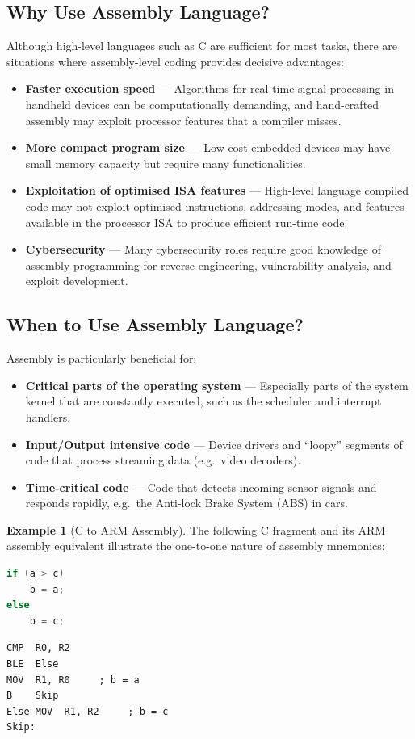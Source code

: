\documentclass[11pt, a4paper, notitlepage]{report}
\theoremstyle{definition}
\theoremstyle{remark}
\theoremstyle{definition}
\newtheorem{example}[theorem]{Example}
\begin{document}
\subsection{Why Use Assembly Language?}

Although high-level languages such as C are sufficient for most tasks, there are situations where assembly-level coding provides decisive advantages:

\begin{itemize}
  \item \textbf{Faster execution speed} --- Algorithms for real-time signal processing in handheld devices can be computationally demanding, and hand-crafted assembly may exploit processor features that a compiler misses.
  \item \textbf{More compact program size} --- Low-cost embedded devices may have small memory capacity but require many functionalities.
  \item \textbf{Exploitation of optimised ISA features} --- High-level language compiled code may not exploit optimised instructions, addressing modes, and features available in the processor ISA to produce efficient run-time code.
  \item \textbf{Cybersecurity} --- Many cybersecurity roles require good knowledge of assembly programming for reverse engineering, vulnerability analysis, and exploit development.
\end{itemize}

\subsection{When to Use Assembly Language?}

Assembly is particularly beneficial for:

\begin{itemize}
  \item \textbf{Critical parts of the operating system} --- Especially parts of the system kernel that are constantly executed, such as the scheduler and interrupt handlers.
  \item \textbf{Input/Output intensive code} --- Device drivers and ``loopy'' segments of code that process streaming data (e.g.\ video decoders).
  \item \textbf{Time-critical code} --- Code that detects incoming sensor signals and responds rapidly, e.g.\ the Anti-lock Brake System (ABS) in cars.
\end{itemize}

\begin{example}[C to ARM Assembly]
The following C fragment and its ARM assembly equivalent illustrate the one-to-one nature of assembly mnemonics:
\begin{lstlisting}[language=C]
if (a > c)
    b = a;
else
    b = c;
\end{lstlisting}
\begin{lstlisting}
CMP  R0, R2
BLE  Else
MOV  R1, R0     ; b = a
B    Skip
Else MOV  R1, R2     ; b = c
Skip:
\end{lstlisting}
\end{example}
\end{document}
